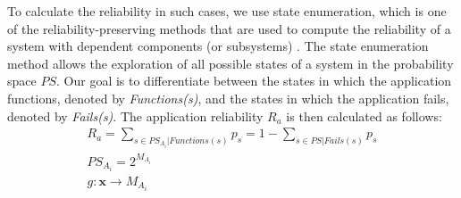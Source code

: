 

To calculate the reliability in such cases, we use state enumeration, which is one of the reliability-preserving methods that are used to compute the reliability of a system with dependent components (or subsystems) \cite{Lucet1999ExactReliability}. The state enumeration method allows the exploration of all possible states of a system in the probability space $P\!S$. Our goal is to differentiate between the states in which the application functions, denoted by \textit{Functions(s)}, and the states in which the application fails, denoted by \textit{Fails(s)}. The application reliability $R_a$ is then calculated as follows:
\begin{align}
\label{eqn_appreliability}
R_a=\sum_{s\in PS_{A_i}|Functions(s)}p_s=1-\sum_{s\in PS|Fails(s)}p_s\\
PS_{A_i}=2^{M_{A_i}}\\
g:\textbf{x}\rightarrow M_{A_i}
\end{align}

